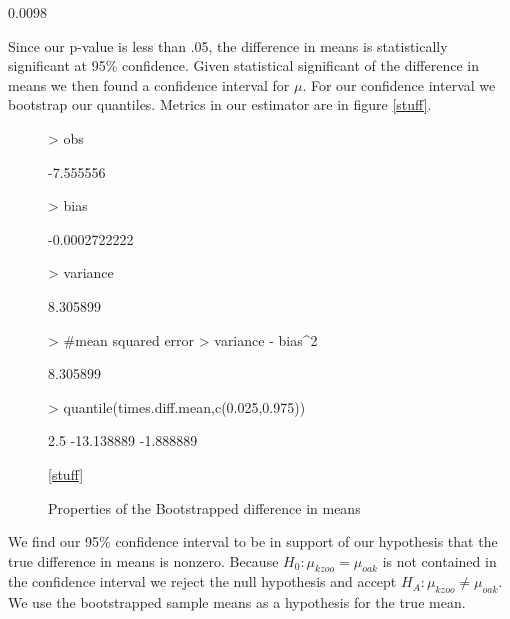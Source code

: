 \documentclass{article}
\begin{document}
\begin{Schunk}
\begin{Soutput}
[1] 0.0098
\end{Soutput}
\end{Schunk}

Since our p-value is less than .05, the difference in means is statistically significant at 95\% confidence. Given statistical significant of the difference in means we then found a confidence interval for $\mu$. For our confidence interval we bootstrap our quantiles. Metrics in our estimator are in figure \ref{stuff}.

\begin{figure}
\caption{Properties of the Bootstrapped difference in means}
\begin{Schunk}
\begin{Sinput}
> obs
\end{Sinput}
\begin{Soutput}
[1] -7.555556
\end{Soutput}
\begin{Sinput}
> bias
\end{Sinput}
\begin{Soutput}
[1] -0.0002722222
\end{Soutput}
\begin{Sinput}
> variance
\end{Sinput}
\begin{Soutput}
[1] 8.305899
\end{Soutput}
\begin{Sinput}
> #mean squared error
> variance - bias^2
\end{Sinput}
\begin{Soutput}
[1] 8.305899
\end{Soutput}
\begin{Sinput}
> quantile(times.diff.mean,c(0.025,0.975))
\end{Sinput}
\begin{Soutput}
      2.5%
-13.138889  -1.888889 
\end{Soutput}
\end{Schunk}
\ref{stuff}
\end{figure}

We find our 95\% confidence interval to be in support of our hypothesis that the true difference in means is nonzero. Because $H_0: \mu_{kzoo} = \mu_{oak}$  is not contained in the confidence interval we reject the null hypothesis and accept $H_A: \mu_{kzoo} \ne \mu_{oak}$. We use the bootstrapped sample means as a hypothesis for the true mean.
\end{document}
